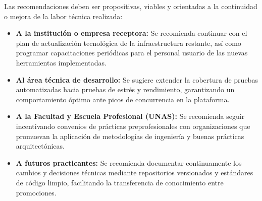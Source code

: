 Las recomendaciones deben ser propositivas, viables y orientadas a la continuidad o mejora de la labor técnica realizada:

\begin{itemize}
  \item \textbf{A la institución o empresa receptora:} Se recomienda continuar con el plan de actualización tecnológica de la infraestructura restante, así como programar capacitaciones periódicas para el personal usuario de las nuevas herramientas implementadas.
  \item \textbf{Al área técnica de desarrollo:} Se sugiere extender la cobertura de pruebas automatizadas hacia pruebas de estrés y rendimiento, garantizando un comportamiento óptimo ante picos de concurrencia en la plataforma.
  \item \textbf{A la Facultad y Escuela Profesional (UNAS):} Se recomienda seguir incentivando convenios de prácticas preprofesionales con organizaciones que promuevan la aplicación de metodologías de ingeniería y buenas prácticas arquitectónicas.
  \item \textbf{A futuros practicantes:} Se recomienda documentar continuamente los cambios y decisiones técnicas mediante repositorios versionados y estándares de código limpio, facilitando la transferencia de conocimiento entre promociones.
\end{itemize}
